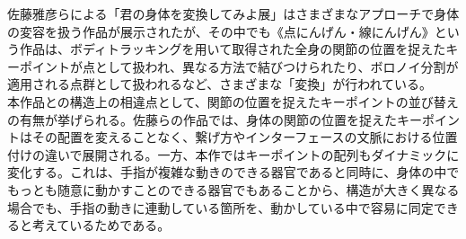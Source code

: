 佐藤雅彦らによる「君の身体を変換してみよ展」はさまざまなアプローチで身体の変容を扱う作品が展示されたが、その中でも《点にんげん・線にんげん》\cite{sato_icc}という作品は、ボディトラッキングを用いて取得された全身の関節の位置を捉えたキーポイントが点として扱われ、異なる方法で結びつけられたり、ボロノイ分割が適用される点群として扱われるなど、さまざまな「変換」が行われている。\\
本作品との構造上の相違点として、関節の位置を捉えたキーポイントの並び替えの有無が挙げられる。佐藤らの作品では、身体の関節の位置を捉えたキーポイントはその配置を変えることなく、繋げ方やインターフェースの文脈における位置付けの違いで展開される。一方、本作ではキーポイントの配列もダイナミックに変化する。これは、手指が複雑な動きのできる器官であると同時に、身体の中でもっとも随意に動かすことのできる器官でもあることから、構造が大きく異なる場合でも、手指の動きに連動している箇所を、動かしている中で容易に同定できると考えているためである。



